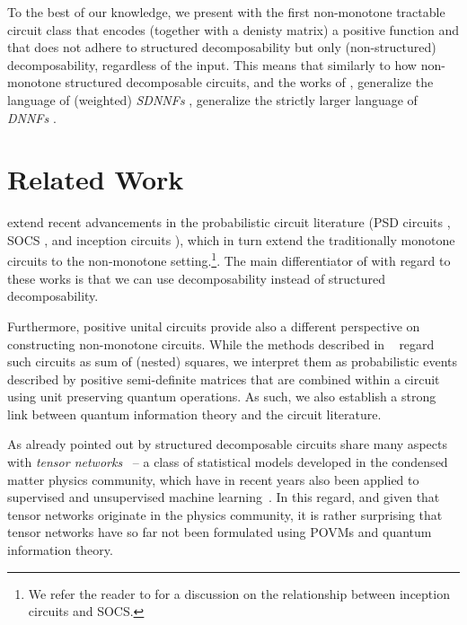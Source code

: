 To the best of our knowledge, we present with \dpuncs the first non-monotone tractable circuit class that encodes (together with a denisty matrix) a positive function and that does not adhere to structured decomposability but only (non-structured) decomposability, regardless of the input.
This means that similarly to how non-monotone structured decomposable circuits, \eg \sdpuncs and the works of \citep{sladek2023encoding,loconte2025sum,wangrelationship}, generalize the language of (weighted) \textit{SDNNFs} \citep{pipatsrisawat2008new}, \dpuncs generalize the strictly larger language of \textit{DNNFs} \citep{darwiche2001decomposable}.








\section{Related Work}
\label{sec:related}
\puncs extend recent advancements in the probabilistic circuit literature (PSD circuits \citep{sladek2023encoding}, SOCS \citep{loconte2025sum}, and inception circuits \citep{wangrelationship}),
which in turn extend the traditionally monotone circuits to the non-monotone setting.\footnote{We refer the reader to \citep[Section 5]{loconte2025sum} for a discussion on the relationship between inception circuits and SOCS.}.
The main differentiator of \puncs with regard to these works is that we can use decomposability instead of structured decomposability.



Furthermore, positive unital circuits provide also a different perspective on constructing non-monotone circuits. While the methods described in ~\citep{sladek2023encoding,loconte2024subtractive,loconte2025sum,wangrelationship} regard such circuits as sum of (nested) squares, we interpret them as probabilistic events described by positive semi-definite matrices that are combined within a circuit using unit preserving quantum operations. As such, we also establish a strong link between quantum information theory and the circuit literature.

As already pointed out by \citet{loconte2024subtractive,loconte2025sum,loconte2025relationship} structured decomposable circuits share many aspects with \textit{tensor networks}~\citep{orus2014practical,white1992density} -- a class of statistical models developed in the condensed matter physics community, which have in recent years also been applied to supervised and unsupervised machine learning~\citep{cheng2019tree,han2018unsupervised,stoudenmire2016supervised}. In this regard, and given that tensor networks originate in the physics community, it is rather surprising that tensor networks have so far not been formulated using POVMs and quantum information theory.

